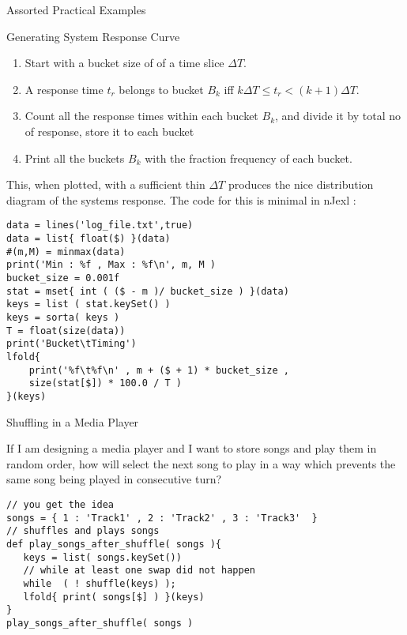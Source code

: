 \begin{section}{Assorted Practical Examples}
\begin{subsection}{Generating System Response Curve}
\begin{enumerate}
\item{Start with a bucket size of of a time slice $\Delta T$. }
\item{A response time $t_r$ belongs to bucket $B_k$ iff $  k \Delta T \le  t_r < (k+1) \Delta T  $. }
\item{Count all the response times within each bucket $B_k$, and divide it by total no of response, store it to each bucket }
\item{Print all the buckets $B_k$ with the fraction frequency of each bucket. }
\end{enumerate}

This, when plotted, with a sufficient thin $\Delta T$ produces the nice distribution diagram
of the systems response.
The code for this is minimal in nJexl :

\begin{center}\begin{minipage}{\linewidth}
\begin{lstlisting}[style=JexlStyle]
data = lines('log_file.txt',true)
data = list{ float($) }(data)
#(m,M) = minmax(data)
print('Min : %f , Max : %f\n', m, M )
bucket_size = 0.001f
stat = mset{ int ( ($ - m )/ bucket_size ) }(data)
keys = list ( stat.keySet() )
keys = sorta( keys )
T = float(size(data)) 
print('Bucket\tTiming')
lfold{
    print('%f\t%f\n' , m + ($ + 1) * bucket_size , 
    size(stat[$]) * 100.0 / T )
}(keys)
\end{lstlisting}  
\end{minipage}\end{center}
\end{subsection}

\begin{subsection}{Shuffling in a Media Player}

If I am designing a media player and I want to store songs and play them in random order, 
how will select the next song to play in a way which prevents the same song being played in consecutive turn?

\begin{center}\begin{minipage}{\linewidth}
\begin{lstlisting}[style=JexlStyle]
// you get the idea 
songs = { 1 : 'Track1' , 2 : 'Track2' , 3 : 'Track3'  }
// shuffles and plays songs 
def play_songs_after_shuffle( songs ){
   keys = list( songs.keySet())
   // while at least one swap did not happen 
   while  ( ! shuffle(keys) );
   lfold{ print( songs[$] ) }(keys)
}
play_songs_after_shuffle( songs )
\end{lstlisting}  
\end{minipage}\end{center}

\end{subsection}

\end{section}

